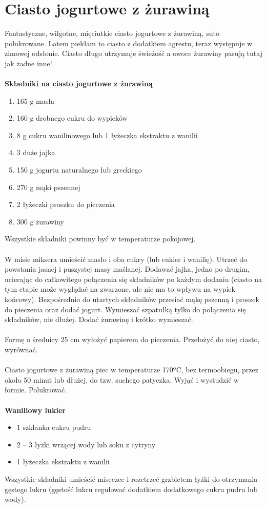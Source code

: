 \documentclass[12pt, letterpaper, titlepage]{article}
\begin{document}
\section{Ciasto jogurtowe z żurawiną}
Fantastyczne, wilgotne, mięciutkie ciasto jogurtowe z żurawiną, suto polukrowane. Latem piekłam to ciasto z dodatkiem agrestu, teraz występuje w zimowej odsłonie. Ciasto długo utrzymuje świeżość a owoce żurawiny pasują tutaj jak żadne inne! \cite{sebas} \\ \\
\textbf{Składniki na ciasto jogurtowe z żurawiną}
\begin{enumerate}
\item 165 g masła
\item 160 g drobnego cukru do wypieków
\item 8 g cukru wanilinowego lub 1 łyżeczka ekstraktu z wanilii
\item 3 duże jajka
\item 150 g jogurtu naturalnego lub greckiego
\item 270 g mąki pszennej
\item 2 łyżeczki proszku do pieczenia
\item 300 g żurawiny
\end{enumerate}
Wszystkie składniki powinny być w temperaturze pokojowej.\\ \\
W misie miksera umieścić masło i oba cukry (lub cukier i wanilię). Utrzeć do powstania jasnej i puszystej masy maślanej. Dodawać jajka, jedno po drugim, ucierając do całkowitego połączenia się składników po każdym dodaniu (ciasto na tym etapie może wyglądać na zwarzone, ale nie ma to wpływu na wypiek końcowy). Bezpośrednio do utartych składników przesiać mąkę pszenną i proszek do pieczenia oraz dodać jogurt. Wymieszać szpatułką tylko do połączenia się składników, nie dłużej. Dodać żurawinę i krótko wymieszać.\\ \\
Formę o średnicy 25 cm wyłożyć papierem do pieczenia. Przełożyć do niej ciasto, wyrównać. \\ \\
Ciasto jogurtowe z żurawiną piec w temperaturze 170ºC, bez termoobiegu, przez około 50 minut lub dłużej, do tzw. suchego patyczka. Wyjąć i wystudzić w formie. Polukrować. \\ \\
\textbf{Waniliowy lukier}
\begin{itemize}
\item 1 szklanka cukru pudru
\item 2 – 3 łyżki wrzącej wody lub soku z cytryny
\item 1 łyżeczka ekstraktu z wanilii
\end{itemize}
Wszystkie składniki umieścić miseczce i rozetrzeć grzbietem łyżki do otrzymania gęstego lukru (gęstość lukru regulować dodatkiem dodatkowego cukru pudru lub wody).
\end{document}
